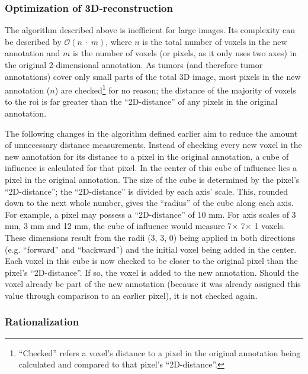 \subsubsection{Optimization of 3D-reconstruction}

The algorithm described above is inefficient for large images. 
Its complexity can be described by $\mathcal{O}(n~\cdot~m)$, where $n$ is the 
total number of voxels in the new annotation and $m$ is the number 
of voxels (or pixels, as it only uses two axes) in the original 2-dimensional
annotation. As tumors (and therefore tumor annotations) cover only small 
parts of the total 3D image, most pixels in the new annotation ($n$) are 
checked\footnote{\enquote{Checked} refers a voxel's distance to a pixel 
in the original annotation being calculated and compared to that pixel's 
\enquote{2D-distance}.} for no reason; the distance of the majority of 
voxels to the \ac{roi} is far greater than the \enquote{2D-distance} 
of any pixels in the original annotation.

The following changes in the algorithm defined earlier aim to reduce the
amount of unnecessary distance measurements. Instead of checking every
new voxel in the new annotation for its distance to a pixel in the original
annotation, a cube of influence is calculated for that pixel. In the center
of this cube of influence lies a pixel in the original annotation. The 
size of the cube is determined by the pixel's \enquote{2D-distance}; 
the \enquote{2D-distance} is divided by each axis' scale. This, rounded down
to the next whole number, gives the \enquote{radius} of the cube along
each axis. For example, a pixel may possess a \enquote{2D-distance} of
10 mm. For axis scales of 3 mm, 3 mm and 12 mm, the cube of influence would
measure 7$\times$ 7$\times$ 1 voxels. These dimensions result from the 
radii (3, 3, 0) being applied in both directions (e.g. \enquote{forward} 
and \enquote{backward}) and the initial voxel being added in the center. 
Each voxel in this cube is now checked to be closer to the original pixel
than the pixel's \enquote{2D-distance}. If so, the voxel is added to the 
new annotation. Should the voxel already be part of the new annotation 
(because it was already assigned this value through comparison to an
earlier pixel), it is not checked again.

\subsubsection{Rationalization}

